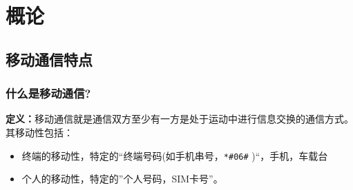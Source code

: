 	\chapter{概论}
	\section{移动通信特点}
	\subsection{什么是移动通信?}
	\textbf{定义：}移动通信就是通信双方至少有一方是处于运动中进行信息交换的通信方式。其移动性包括：
	\begin{itemize}
		\item 终端的移动性，特定的“终端号码(如手机串号，\verb|*#06#| )“，手机，车载台
		\item 个人的移动性，特定的”个人号码，SIM卡号”。
	\end{itemize}
